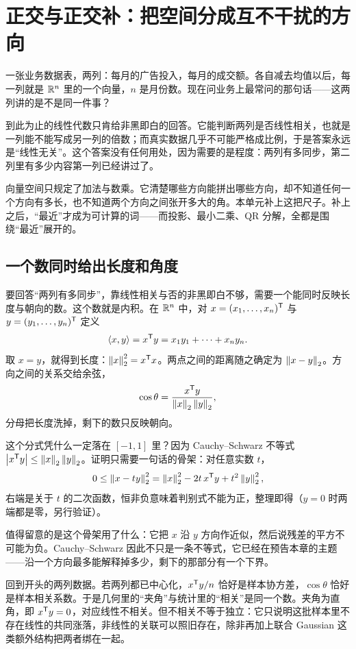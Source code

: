 \section{正交与正交补：把空间分成互不干扰的方向}
\label{sec:03-Linear-Algebra/03-Orthogonality/01}

一张业务数据表，两列：每月的广告投入，每月的成交额。各自减去均值以后，每一列就是 \(\mathbb{R}^n\) 里的一个向量，\(n\) 是月份数。现在问业务上最常问的那句话——这两列讲的是不是同一件事？

到此为止的线性代数只肯给非黑即白的回答。它能判断两列是否线性相关，也就是一列能不能写成另一列的倍数；而真实数据几乎不可能严格成比例，于是答案永远是``线性无关''。这个答案没有任何用处，因为需要的是程度：两列有多同步，第二列里有多少内容第一列已经讲过了。

向量空间只规定了加法与数乘。它清楚哪些方向能拼出哪些方向，却不知道任何一个方向有多长，也不知道两个方向之间张开多大的角。本单元补上这把尺子。补上之后，``最近''才成为可计算的词——而投影、最小二乘、QR 分解，全都是围绕``最近''展开的。

\subsection{一个数同时给出长度和角度}

要回答``两列有多同步''，靠线性相关与否的非黑即白不够，需要一个能同时反映长度与朝向的数。这个数就是内积。在 \(\mathbb{R}^n\) 中，对 \(x=(x_1,\ldots,x_n)^{\mathsf{T}}\) 与 \(y=(y_1,\ldots,y_n)^{\mathsf{T}}\) 定义
\[
\left\langle x,y\right\rangle=x^{\mathsf{T}}y=x_1y_1+\cdots+x_ny_n .
\]
取 \(x=y\)，就得到长度：\(\left\lVert x\right\rVert_2^2=x^{\mathsf{T}}x\)。两点之间的距离随之确定为 \(\left\lVert x-y\right\rVert_2\)。方向之间的关系交给余弦，
\[
\cos\theta=\frac{x^{\mathsf{T}}y}{\left\lVert x\right\rVert_2\left\lVert y\right\rVert_2},
\]
分母把长度洗掉，剩下的数只反映朝向。

这个分式凭什么一定落在 \([-1,1]\) 里？因为 Cauchy--Schwarz 不等式 \(\left|x^{\mathsf{T}}y\right|\le\left\lVert x\right\rVert_2\left\lVert y\right\rVert_2\)。证明只需要一句话的骨架：对任意实数 \(t\)，
\[
0\le\left\lVert x-ty\right\rVert_2^2=\left\lVert x\right\rVert_2^2-2t\,x^{\mathsf{T}}y+t^2\left\lVert y\right\rVert_2^2 ,
\]
右端是关于 \(t\) 的二次函数，恒非负意味着判别式不能为正，整理即得（\(y=0\) 时两端都是零，另行验证）。

值得留意的是这个骨架用了什么：它把 \(x\) 沿 \(y\) 方向作近似，然后说残差的平方不可能为负。Cauchy--Schwarz 因此不只是一条不等式，它已经在预告本章的主题——沿一个方向最多能解释掉多少，剩下的那部分有一个下界。

回到开头的两列数据。若两列都已中心化，\(x^{\mathsf{T}}y/n\) 恰好是样本协方差，\(\cos\theta\) 恰好是样本相关系数。于是几何里的``夹角''与统计里的``相关''是同一个数。夹角为直角，即 \(x^{\mathsf{T}}y=0\)，对应线性不相关。但不相关不等于独立：它只说明这批样本里不存在线性的共同涨落，非线性的关联可以照旧存在，除非再加上联合 Gaussian 这类额外结构把两者绑在一起。

